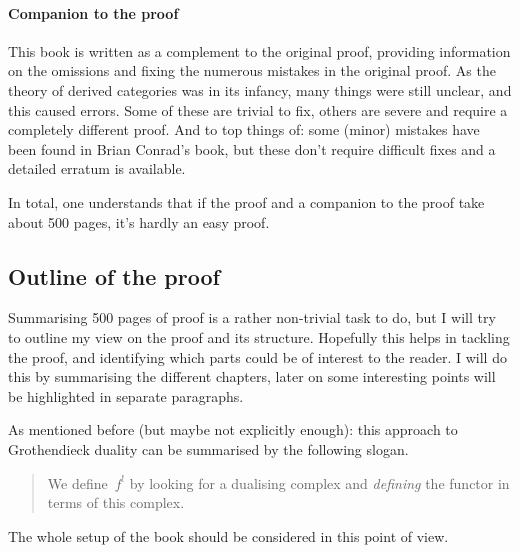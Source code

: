 \documentclass[10pt,a4paper]{article}
\begin{document}
\paragraph{Companion to the proof}
This book is written as a complement to the original proof, providing information on the omissions and fixing the numerous mistakes in the original proof. As the theory of derived categories was in its infancy, many things were still unclear, and this caused errors. Some of these are trivial to fix, others are severe and require a completely different proof. And to top things of: some (minor) mistakes have been found in Brian Conrad's book, but these don't require difficult fixes and a detailed erratum is available.

In total, one understands that if the proof and a companion to the proof take about 500 pages, it's hardly an easy proof.

\subsection{Outline of the proof}
Summarising 500 pages of proof is a rather non-trivial task to do, but I will try to outline my view on the proof and its structure. Hopefully this helps in tackling the proof, and identifying which parts could be of interest to the reader. I will do this by summarising the different chapters, later on some interesting points will be highlighted in separate paragraphs.

As mentioned before (but maybe not explicitly enough): this approach to Grothendieck duality can be summarised by the following slogan.
\begin{quote}
  We define~$f^!$ by looking for a dualising complex and \emph{defining} the functor in terms of this complex.
\end{quote}
The whole setup of the book should be considered in this point of view.
\end{document}
